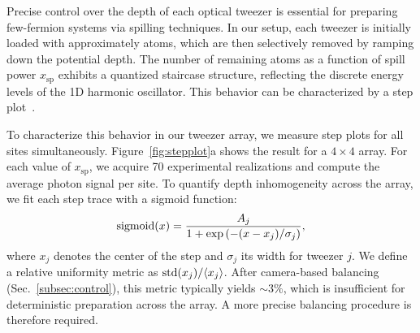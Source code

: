 



Precise control over the depth of each optical tweezer is essential for preparing few-fermion systems via spilling techniques. In our setup, each tweezer is initially loaded with approximately  atoms, which are then selectively removed by ramping down the potential depth. The number of remaining atoms as a function of spill power $x_{\mathrm{sp}}$ exhibits a quantized staircase structure, reflecting the discrete energy levels of the 1D harmonic oscillator. This behavior can be characterized by a step plot~\cite{holten_pauli_2022}.

To characterize this behavior in our tweezer array, we measure step plots for all sites simultaneously. Figure~\ref{fig:stepplot}a shows the result for a $4 \times 4$ array. For each value of $x_{\mathrm{sp}}$, we acquire 70 experimental realizations and compute the average photon signal per site. 
To quantify depth inhomogeneity across the array, we fit each step trace with a sigmoid function:
\begin{equation*}
    \mathop{\mathrm{sigmoid}}\nolimits(x) = \frac{A_j}{1 + \exp\left(-(x - x_j)/\sigma_j\right)},
\end{equation*}
where $x_j$ denotes the center of the step and $\sigma_j$ its width for tweezer $j$. We define a relative uniformity metric as $\mathop{\mathrm{std}}\nolimits(x_j) / \langle x_j \rangle$. After camera-based balancing (Sec.~\ref{subsec:control}), this metric typically yields $\sim 3\%$, which is insufficient for deterministic preparation across the array. A more precise balancing procedure is therefore required.




